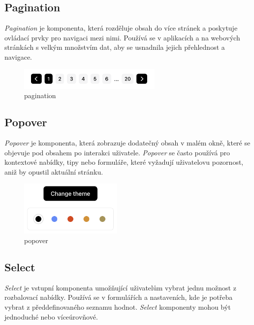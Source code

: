 \subsection{Pagination}
\emph{Pagination} je komponenta, která rozděluje obsah do více stránek a poskytuje ovládací prvky pro navigaci mezi nimi. Používá se v aplikacích a na webových stránkách s velkým množstvím dat, aby se usnadnila jejich přehlednost a navigace.

\begin{figure}[H]
  \centering
  \includegraphics[width=7cm]{images/pagination}
  \captionsetup{justification=centering,margin=2cm}
  \caption{pagination} \label{picture:pagination}
\end{figure}

\subsection{Popover}
\emph{Popover} je komponenta, která zobrazuje dodatečný obsah v malém okně, které se objevuje pod obsahem po interakci uživatele. \emph{Popover} se často používá pro kontextové nabídky, tipy nebo formuláře, které vyžadují uživatelovu pozornost, aniž by opustil aktuální stránku.

\begin{figure}[H]
  \centering
  \includegraphics[width=5cm]{images/popover}
  \captionsetup{justification=centering,margin=2cm}
  \caption{popover} \label{picture:popover}
\end{figure}

\subsection{Select}
\emph{Select} je vstupní komponenta umožňující uživatelům vybrat jednu možnost z rozbalovací nabídky. Používá se v formulářích a nastaveních, kde je potřeba vybrat z předdefinovaného seznamu hodnot. \emph{Select} komponenty mohou být jednoduché nebo víceúrovňové.

